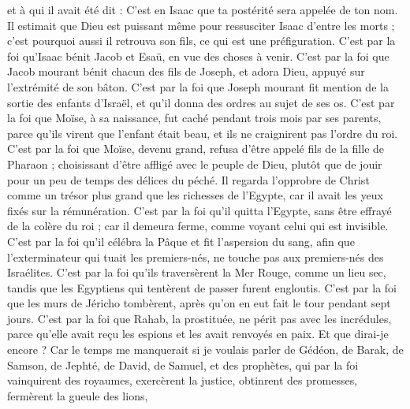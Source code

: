 \begin{multicols}{2}
et à qui il avait été dit : C’est en Isaac que ta postérité sera appelée de ton nom.
Il estimait que Dieu est puissant même pour ressusciter Isaac d'entre les morts ; c'est pourquoi aussi il retrouva son fils, ce qui est une préfiguration.
C’est par la foi qu’Isaac bénit Jacob et Esaü, en vue des choses à venir.
C’est par la foi que Jacob mourant bénit chacun des fils de Joseph, et adora Dieu, appuyé sur l’extrémité de son bâton.
C’est par la foi que Joseph mourant fit mention de la sortie des enfants d'Israël, et qu’il donna des ordres au sujet de ses os.
C’est par la foi que Moïse, à sa naissance, fut caché pendant trois mois par ses parents, parce qu’ils virent que l’enfant était beau, et ils ne craignirent pas l’ordre du roi.
C’est par la foi que Moïse, devenu grand, refusa d'être appelé fils de la fille de Pharaon ;
choisissant d’être affligé avec le peuple de Dieu, plutôt que de jouir pour un peu de temps des délices du péché.
Il regarda l'opprobre de Christ comme un trésor plus grand que les richesses de l'Egypte, car il avait les yeux fixés sur la rémunération.
C’est par la foi qu’il quitta l'Egypte, sans être effrayé de la colère du roi ; car il demeura ferme, comme voyant celui qui est invisible.
C’est par la foi qu’il célébra la Pâque et fit l'aspersion du sang, afin que l’exterminateur qui tuait les premiers-nés, ne touche pas aux premiers-nés des Israélites.
C’est par la foi qu’ils traversèrent la Mer Rouge, comme un lieu sec, tandis que les Egyptiens qui tentèrent de passer furent engloutis.
C’est par la foi que les murs de Jéricho tombèrent, après qu'on en eut fait le tour pendant sept jours.
C’est par la foi que Rahab, la prostituée, ne périt pas avec les incrédules, parce qu’elle avait reçu les espions et les avait renvoyés en paix.
Et que dirai-je encore ? Car le temps me manquerait si je voulais parler de Gédéon, de Barak, de Samson, de Jephté, de David, de Samuel, et des prophètes,
qui par la foi vainquirent des royaumes, exercèrent la justice, obtinrent des promesses, fermèrent la gueule des lions,

\end{multicols}

